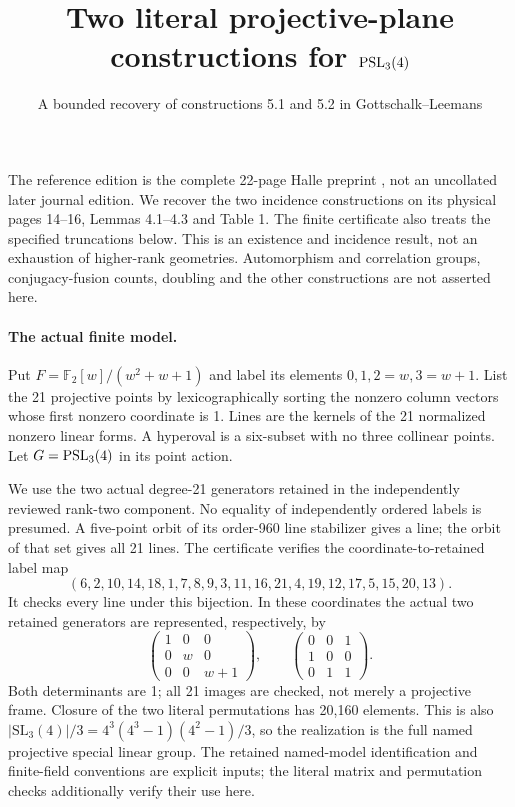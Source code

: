 \documentclass[11pt]{article}
\title{Two literal projective-plane constructions for $\operatorname{PSL}_3(4)$}
\author{A bounded recovery of constructions 5.1 and 5.2 in Gottschalk--Leemans}
\date{}
\begin{document}
\maketitle
\noindent
The reference edition is the complete 22-page Halle preprint \cite{GL}, not
an uncollated later journal edition. We recover the two incidence
constructions on its physical pages 14--16, Lemmas 4.1--4.3 and Table 1.
The finite certificate also treats the specified truncations below. This is
an existence and incidence result, not an exhaustion of higher-rank geometries.
Automorphism and correlation groups, conjugacy-fusion counts, doubling and
the other constructions are not asserted here.

\paragraph{The actual finite model.}
Put $F=\mathbb F_2[w]/(w^2+w+1)$ and label its elements $0,1,2=w,3=w+1$.
List the 21 projective points by lexicographically sorting the nonzero
column vectors whose first nonzero coordinate is 1. Lines are the kernels
of the 21 normalized nonzero linear forms. A hyperoval is a six-subset with
no three collinear points. Let $G=\operatorname{PSL}_3(4)$ in its point action.

We use the two actual degree-21 generators retained in the independently
reviewed rank-two component. No equality of independently ordered labels
is presumed. A five-point orbit of its order-960 line stabilizer gives a
line; the orbit of that set gives all 21 lines. The certificate verifies the
coordinate-to-retained label map
\[
(6,2,10,14,18,1,7,8,9,3,11,16,21,4,19,12,17,5,15,20,13).
\]
It checks every line under this bijection. In these coordinates the actual
two retained generators are represented, respectively, by
\[
 \begin{pmatrix}1&0&0\\0&w&0\\0&0&w+1\end{pmatrix},\qquad
 \begin{pmatrix}0&0&1\\1&0&0\\0&1&1\end{pmatrix}.                 \tag{1}
\]
Both determinants are 1; all 21 images are checked, not merely a projective
frame. Closure of the two literal permutations has 20,160 elements. This is
also $|\mathrm{SL}_3(4)|/3=4^3(4^3-1)(4^2-1)/3$, so the realization is
the full named projective special linear group. The retained named-model
identification and finite-field conventions are explicit inputs; the literal
matrix and permutation checks additionally verify their use here.
\end{document}
